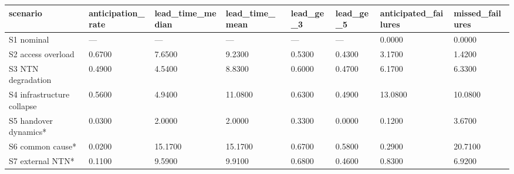 \begin{tabular}{llllllll}
\toprule
scenario & anticipation\_rate & lead\_time\_median & lead\_time\_mean & lead\_ge\_3 & lead\_ge\_5 & anticipated\_failures & missed\_failures \\
\midrule
S1 nominal & — & — & — & — & — & 0.0000 & 0.0000 \\
S2 access overload & 0.6700 & 7.6500 & 9.2300 & 0.5300 & 0.4300 & 3.1700 & 1.4200 \\
S3 NTN degradation & 0.4900 & 4.5400 & 8.8300 & 0.6000 & 0.4700 & 6.1700 & 6.3300 \\
S4 infrastructure collapse & 0.5600 & 4.9400 & 11.0800 & 0.6300 & 0.4900 & 13.0800 & 10.0800 \\
S5 handover dynamics* & 0.0300 & 2.0000 & 2.0000 & 0.3300 & 0.0000 & 0.1200 & 3.6700 \\
S6 common cause* & 0.0200 & 15.1700 & 15.1700 & 0.6700 & 0.5800 & 0.2900 & 20.7100 \\
S7 external NTN* & 0.1100 & 9.5900 & 9.9100 & 0.6800 & 0.4600 & 0.8300 & 6.9200 \\
\bottomrule
\end{tabular}
